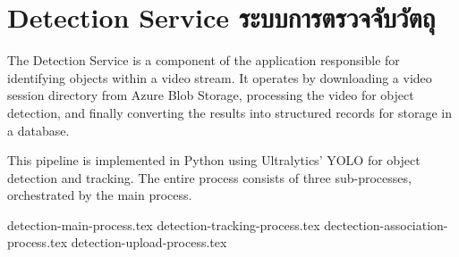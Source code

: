 \section{\ifenglish Detection Service \else ระบบการตรวจจับวัตถุ \fi}
The Detection Service is a component of the application responsible for identifying objects within a video stream. It operates by downloading a video session directory from Azure Blob Storage, processing the video for object detection, and finally converting the results into structured records for storage in a database. 

This pipeline is implemented in Python using Ultralytics' YOLO for object detection and tracking. The entire process consists of three sub-processes, orchestrated by the main process.

\newcommand{\dir}{chapters/approach/detection}
{detection-main-process.tex}
{detection-tracking-process.tex}
{dectection-association-process.tex}
{detection-upload-process.tex}